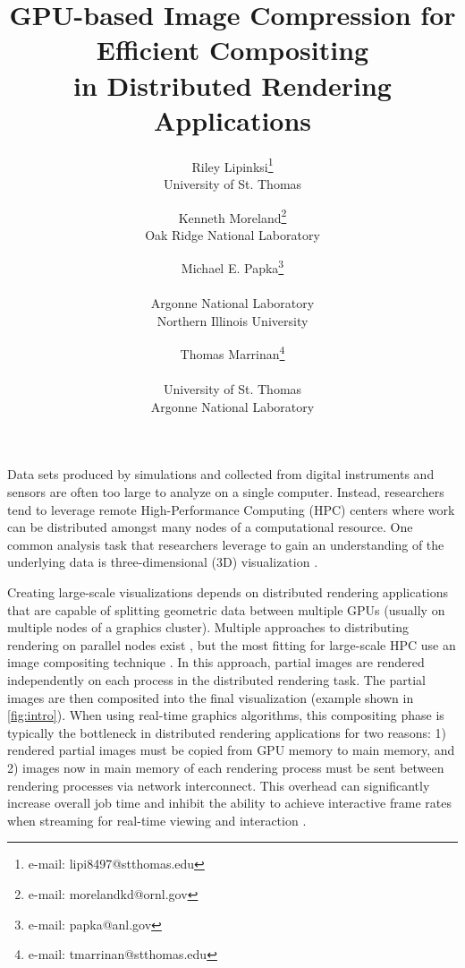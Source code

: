 \documentclass{vgtc}                          %
\title{GPU-based Image Compression for Efficient Compositing\texorpdfstring{\\}{ }in Distributed Rendering Applications }
\author{Riley Lipinksi\thanks{e-mail: lipi8497@stthomas.edu}\\ %
     \scriptsize University of St. Thomas %
\and Kenneth Moreland\thanks{e-mail: morelandkd@ornl.gov}\\ %
     \scriptsize Oak Ridge National Laboratory %
\and Michael E. Papka\thanks{e-mail: papka@anl.gov}\\ %
     \parbox{1.4in}{\scriptsize \centering Argonne National Laboratory \\ Northern Illinois University}
\and Thomas Marrinan\thanks{e-mail: tmarrinan@stthomas.edu}\\ %
     \parbox{1.4in}{\scriptsize \centering University of St. Thomas \\ Argonne National Laboratory}}
\begin{document}
\setlength{\abovedisplayskip}{0pt} %
\setlength{\belowdisplayskip}{12pt} %



\maketitle

Data sets produced by simulations and collected from digital instruments and sensors are often too large to analyze on a single computer. Instead, researchers tend to leverage remote High-Performance Computing (HPC) centers where work can be distributed amongst many nodes of a computational resource. One common analysis task that researchers leverage to gain an understanding of the underlying data is three-dimensional (3D) visualization \cite{Stahli_2018, Taylor_2000}. 

Creating large-scale visualizations depends on distributed rendering applications that are capable of splitting geometric data between multiple GPUs (usually on multiple nodes of a graphics cluster).
Multiple approaches to distributing rendering on parallel nodes exist \cite{Molnar1994}, but the most fitting for large-scale HPC use an image compositing technique \cite{Wylie2001}.
In this approach, partial images are rendered independently on each process in the distributed rendering task. The partial images are then composited into the final visualization (example shown in \autoref{fig:intro}). When using real-time graphics algorithms, this compositing phase is typically the bottleneck in distributed rendering applications for two reasons: 1) rendered partial images must be copied from GPU memory to main memory, and 2) images now in main memory of each rendering process must be sent between rendering processes via network interconnect. This overhead can significantly increase overall job time and inhibit the ability to achieve interactive frame rates when streaming for real-time viewing and interaction \cite{Eilemann_2020, Moreland_2011}.
\end{document}
